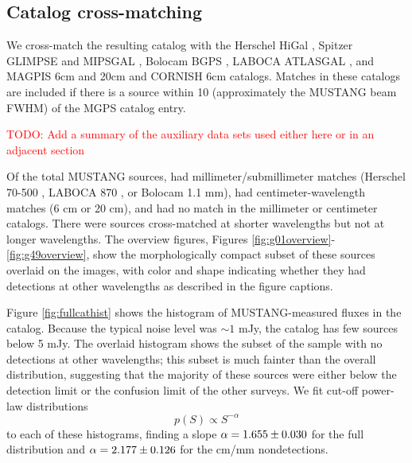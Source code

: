\documentclass[twocolumn]{aastex62}
\def\todo#1{{\textcolor{red}{TODO: #1}}}
\begin{document}
\subsection{Catalog cross-matching}
\label{sec:catalogmatching}
We cross-match the resulting catalog with the Herschel HiGal
\citep{Elia2017a}, Spitzer GLIMPSE and MIPSGAL
\citep{Churchwell2009a,Gutermuth2015a},
Bolocam BGPS \citep{Aguirre2011a,Rosolowsky2010a,Ginsburg2013a}, LABOCA ATLASGAL
\citep{Urquhart2014c},
and MAGPIS 6cm and 20cm
\citep{Giveon2005a} and CORNISH 6cm \citep{Hoare2012a} catalogs.
Matches in these catalogs are included if there is a source within 10\arcsec
(approximately the MUSTANG beam FWHM) of the MGPS catalog entry.

\todo{Add a summary of the auxiliary data sets used either here or in an adjacent section}

Of the \nsources total MUSTANG sources, \mmdetections had millimeter/submillimeter
matches (Herschel 70-500 \um, LABOCA 870 \um, or Bolocam 1.1 mm), \cmdetections 
had centimeter-wavelength matches (6 cm or 20 cm), and \cmmmnondetections
had no match in the millimeter or centimeter catalogs.  There were
\mmdetectionscmnondetections sources cross-matched at shorter wavelengths
but not at longer wavelengths.  The overview figures, Figures
\ref{fig:g01overview}-\ref{fig:g49overview}, show the morphologically
compact subset of these sources overlaid on the images, with color and shape
indicating whether they had detections at other wavelengths as
described in the figure captions.

Figure \ref{fig:fullcathist} shows the histogram of MUSTANG-measured fluxes
in the catalog.  Because the typical noise level was $\sim1$ mJy, the catalog
has few sources below 5 mJy.  The overlaid histogram shows the subset of
the sample with no detections at other wavelengths; this subset is much
fainter than the overall distribution, suggesting that the majority
of these sources were either below the detection limit or the confusion
limit of the other surveys.  We fit cut-off power-law distributions
\begin{equation}
    p(S) \propto S^{-\alpha}
\end{equation}
to each of these histograms\citep{Clauset2007a,Alstott2014a}, finding a slope
$\alpha=1.655\pm0.030$ for the full distribution and
$\alpha=2.177\pm0.126$ for the cm/mm nondetections.
\end{document}
